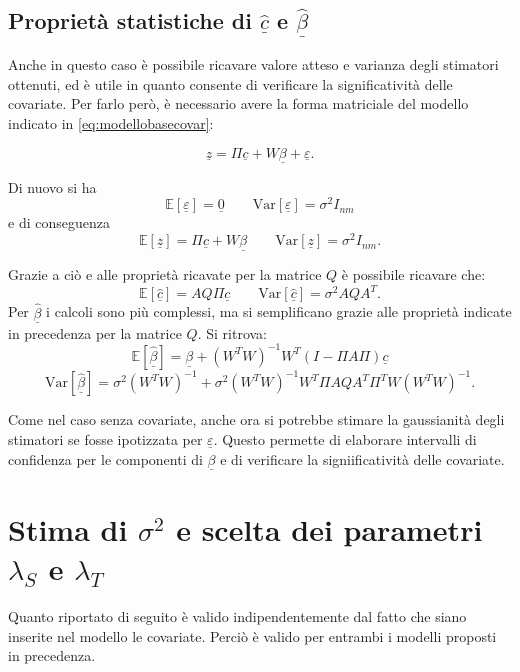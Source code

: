 \documentclass[a4paper,11pt,twoside,openright]{book}							%
\begin{document}
\subsection*{Proprietà statistiche di $\hat  {\underline c}$ e $\hat  {\underline \beta}$}
Anche in questo caso è possibile ricavare valore atteso e varianza degli stimatori ottenuti, ed è utile in quanto consente di verificare la significatività delle covariate. Per farlo però, è necessario avere la forma matriciale del modello indicato in \ref{eq:modellobasecovar}:

\begin{equation}
\label{eq:modellobasecovarmatric}
\underline z=\Pi \underline c + W \underline \beta + \underline \varepsilon .
\end{equation}

Di nuovo si ha 
$$
\mathbb{E}[\underline \varepsilon] = \underline 0 \qquad \mathrm{Var}[\underline \varepsilon] = \sigma^2 I_{nm}
$$
e di conseguenza
$$
\mathbb{E}[\underline z] = \Pi \underline c + W \underline \beta \qquad \mathrm{Var}[\underline z] = \sigma^2 I_{nm} .
$$

Grazie a ciò e alle proprietà ricavate per la matrice $Q$ è possibile ricavare che:
$$
\mathbb{E}[\hat  {\underline c}] = AQ\Pi \underline c \qquad \mathrm{Var}[\hat  {\underline c}] = \sigma^2 AQA^T .
$$
Per $\hat  {\underline \beta}$ i calcoli sono più complessi, ma si semplificano grazie alle proprietà indicate in precedenza per la matrice $Q$. Si ritrova:
$$
\mathbb{E}[\hat  {\underline \beta}] = \underline \beta + (W^TW)^{-1}W^T(I-\Pi A\Pi)\underline c
$$
$$ \mathrm{Var}[\hat  {\underline \beta}] = \sigma^2 (W^TW)^{-1} + \sigma^2 (W^TW)^{-1}W^T \Pi A Q A^T \Pi^T W(W^TW)^{-1}.
$$

Come nel caso senza covariate, anche ora si potrebbe stimare la gaussianità degli stimatori se fosse ipotizzata per $\underline \varepsilon$. Questo permette di elaborare intervalli di confidenza per le componenti di $\underline \beta$ e di verificare la signiificatività delle covariate.


\section{Stima di $\sigma^2$ e scelta dei parametri $\lambda_S$ e $\lambda_T$}
\label{sez:GCV}

Quanto riportato di seguito è valido indipendentemente dal fatto che siano inserite nel modello le covariate. Perciò è valido per entrambi i modelli proposti in precedenza.
\end{document}

